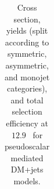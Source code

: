 \begin{table}
{\begin{tabular}{rrlrrrrr}
    \hline\hline
    \end{tabular}
    }
    \caption{Cross section, yields (split according to symmetric, asymmetric, 
        and monojet categories), and total selection efficiency at $12.9$~\ifb 
        for pseudoscalar mediated DM+jets models.}
    \label{tab:DMPS_yld}
\end{table}



